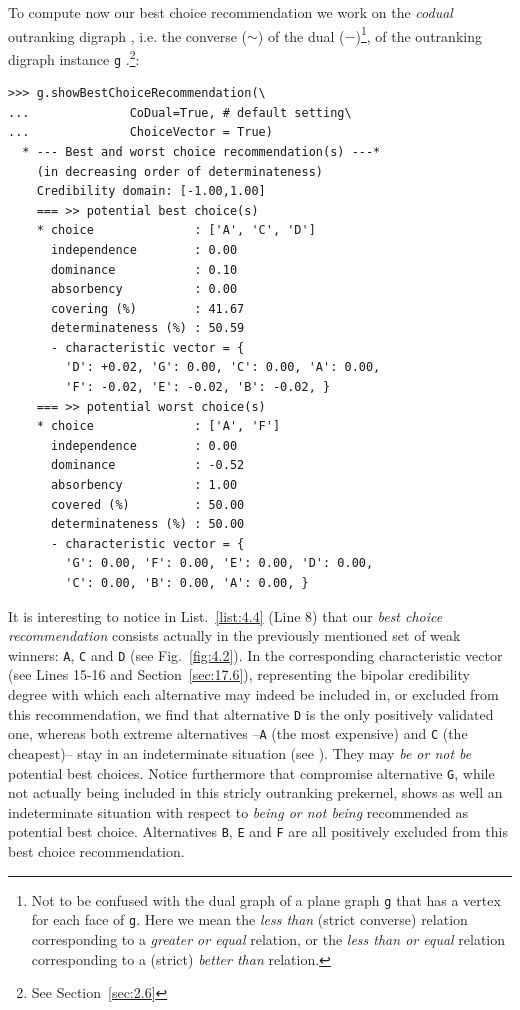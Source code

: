 To compute now our \Rubis best choice recommendation we work on the \emph{codual} outranking digraph , i.e. the converse ($\sim$) of the dual ($-$)\footnote{Not to be confused with the dual graph of a plane graph \texttt{g} that has a vertex for each face of \texttt{g}. Here we mean the \emph{less than} (strict converse) relation corresponding to a \emph{greater or equal} relation, or the \emph{less than or equal} relation corresponding to a (strict) \emph{better than} relation.}, of the outranking digraph instance \texttt{g} \citep{BIS-2013}.\footnote{See Section~\vref{sec:2.6}}:
\begin{lstlisting}[caption={Computing the best choice recommendation},label=list:4.4]
>>> g.showBestChoiceRecommendation(\
...              CoDual=True, # default setting\
...              ChoiceVector = True)   
  * --- Best and worst choice recommendation(s) ---*
    (in decreasing order of determinateness)   
    Credibility domain: [-1.00,1.00]
    === >> potential best choice(s)
    * choice              : ['A', 'C', 'D']
      independence        : 0.00
      dominance           : 0.10
      absorbency          : 0.00
      covering (%)        : 41.67
      determinateness (%) : 50.59
      - characteristic vector = {
        'D': +0.02, 'G': 0.00, 'C': 0.00, 'A': 0.00,
        'F': -0.02, 'E': -0.02, 'B': -0.02, }
    === >> potential worst choice(s) 
    * choice              : ['A', 'F']
      independence        : 0.00
      dominance           : -0.52
      absorbency          : 1.00
      covered (%)         : 50.00
      determinateness (%) : 50.00
      - characteristic vector = {
        'G': 0.00, 'F': 0.00, 'E': 0.00, 'D': 0.00,
        'C': 0.00, 'B': 0.00, 'A': 0.00, }
\end{lstlisting}				  
It is interesting to notice in List.~\vref{list:4.4} (Line 8) that our \emph{best choice recommendation} consists actually in the previously mentioned set of weak \Condorcet winners: \texttt{A}, \texttt{C} and \texttt{D} (see Fig.~\vref{fig:4.2}). In the corresponding characteristic vector (see Lines 15-16 and Section~\vref{sec:17.6}), representing the bipolar credibility degree with which each alternative may indeed be included in, or excluded from this recommendation, we find that alternative \texttt{D} is the only positively validated one, whereas both extreme alternatives --\texttt{A} (the most expensive) and \texttt{C} (the cheapest)-- stay in an indeterminate situation (see \citet{BIS-2006a,BIS-2006b}). They may \emph{be or not be} potential best choices. Notice furthermore that compromise alternative \texttt{G}, while not actually being included in this stricly outranking prekernel, shows as well an indeterminate situation with respect to \emph{being or not being} recommended as potential best choice. Alternatives \texttt{B}, \texttt{E} and \texttt{F} are all positively excluded from this best choice recommendation.

